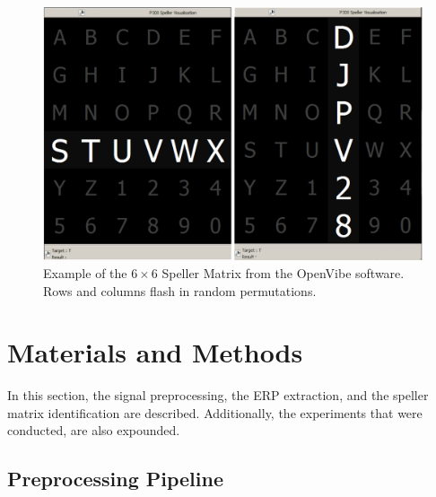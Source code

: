 \begin{figure}[h!]
\centering
\includegraphics[width=15cm]{images/openvibep300matrix.png}
\caption[P300 Speller Matrix]{Example of the $6 \times 6$ Speller Matrix from the OpenVibe software.  Rows and columns flash in random permutations.}
\label{fig:p300matrix}
\end{figure}



\section{Materials and Methods}


In this section, the signal preprocessing, the ERP extraction, and the speller matrix identification are described.  Additionally, the experiments that were conducted, are also expounded.

\subsection{Preprocessing Pipeline} \label{Pipeline}

